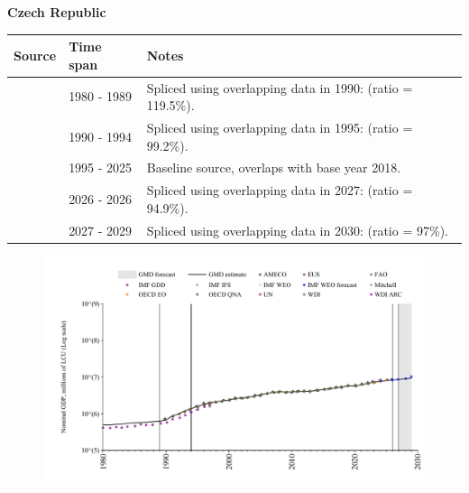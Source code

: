 \documentclass[12pt,a4paper,landscape]{article}
\begin{document}
\begin{adjustbox}{max totalsize={\paperwidth}{\paperheight},center}
\begin{minipage}[t][\textheight][t]{\textwidth}
\vspace*{0.5cm}
{}
\begin{center}
{\Large\bfseries Czech Republic}
\end{center}
\vspace{0.5cm}
\begin{table}[H]
\centering
\small
\begin{tabular}{|l|l|l|}
\hline
\textbf{Source} & \textbf{Time span} & \textbf{Notes} \\
\hline
\rowcolor{white}\cite{WDI_ARC}& 1980 - 1989 &Spliced using overlapping data in 1990: (ratio = 119.5\%).\\
\rowcolor{lightgray}\cite{AMECO}& 1990 - 1994 &Spliced using overlapping data in 1995: (ratio = 99.2\%).\\
\rowcolor{white}\cite{OECD_EO}& 1995 - 2025 &Baseline source, overlaps with base year 2018.\\
\rowcolor{lightgray}\cite{AMECO}& 2026 - 2026 &Spliced using overlapping data in 2027: (ratio = 94.9\%).\\
\rowcolor{white}\cite{IMF_WEO_forecast}& 2027 - 2029 &Spliced using overlapping data in 2030: (ratio = 97\%).\\
\hline
\end{tabular}
\end{table}
\begin{figure}[H]
\centering
\includegraphics[width=\textwidth,height=0.6\textheight,keepaspectratio]{graphs/CZE_nGDP.pdf}
\end{figure}
\end{minipage}
\end{adjustbox}
\end{document}
